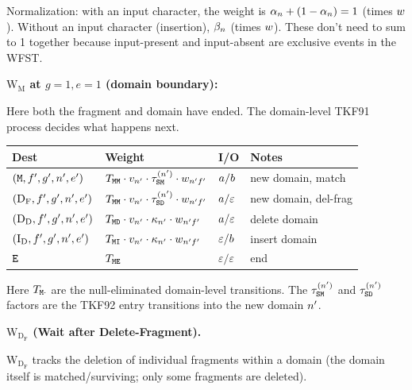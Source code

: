 Normalization: with an input character, the weight is
$\alpha_n + (1-\alpha_n) = 1$ (times $w$).
Without an input character (insertion), $\beta_n$ (times $w$).
These don't need to sum to 1 together because input-present and input-absent
are exclusive events in the WFST.

\bigskip
\noindent\textbf{$\mathrm{W_M}$ at $g=1, e=1$ (domain boundary):}

Here both the fragment and domain have ended.
The domain-level TKF91 process decides what happens next.

\begin{center}
\renewcommand{\arraystretch}{1.4}
\begin{tabular}{llll}
\hline
Dest & Weight & I/O & Notes \\
\hline
$({\tt M}, f', g', n', e')$ &
  $T_{{\tt M}{\tt M}} \cdot v_{n'} \cdot
   \tau^{(n')}_{{\tt S}{\tt M}} \cdot w_{n'f'}$ &
  $a / b$ &
  new domain, match \\
$(\mathrm{D_F}, f', g', n', e')$ &
  $T_{{\tt M}{\tt M}} \cdot v_{n'} \cdot
   \tau^{(n')}_{{\tt S}{\tt D}} \cdot w_{n'f'}$ &
  $a / \varepsilon$ &
  new domain, del-frag \\
$(\mathrm{D_D}, f', g', n', e')$ &
  $T_{{\tt M}{\tt D}} \cdot v_{n'} \cdot
   \kappa_{n'} \cdot w_{n'f'}$ &
  $a / \varepsilon$ &
  delete domain \\
$(\mathrm{I_D}, f', g', n', e')$ &
  $T_{{\tt M}{\tt I}} \cdot v_{n'} \cdot
   \kappa_{n'} \cdot w_{n'f'}$ &
  $\varepsilon / b$ &
  insert domain \\
${\tt E}$ &
  $T_{{\tt M}{\tt E}}$ &
  $\varepsilon / \varepsilon$ &
  end \\
\hline
\end{tabular}
\end{center}

Here $T_{{\tt M}\cdot}$ are the null-eliminated domain-level transitions.
The $\tau^{(n')}_{{\tt S}{\tt M}}$ and $\tau^{(n')}_{{\tt S}{\tt D}}$ factors
are the TKF92 entry transitions into the new domain $n'$.

\bigskip
\noindent\textbf{$\mathrm{W_{D_F}}$ (Wait after Delete-Fragment).}

$\mathrm{W_{D_F}}$ tracks the deletion of individual fragments within a domain
(the domain itself is matched/surviving; only some fragments are deleted).

